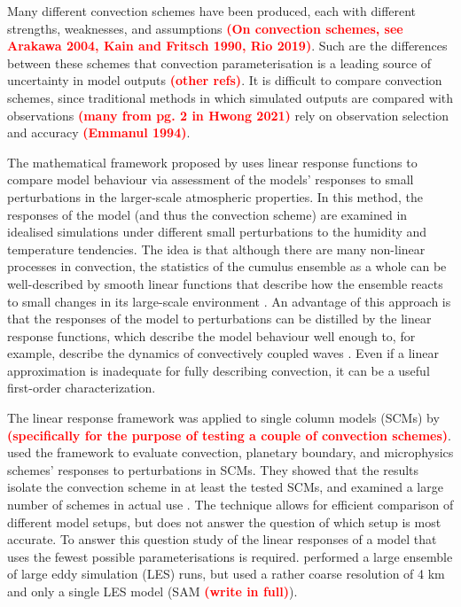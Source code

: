 \documentclass[draft]{agujournal2019}
\newcommand{\todo}[1]{\textcolor{red}{\textbf{(#1)}}}
\begin{document}
Many different convection schemes have been produced, each with different
strengths, weaknesses, and assumptions \todo{On convection schemes, see Arakawa
2004, Kain and Fritsch 1990, Rio 2019}. Such are the differences between these
schemes that convection parameterisation is a leading source of uncertainty in
model outputs \cite{Hwong_JAMES_2021} \todo{other refs}. It is difficult to
compare convection schemes, since traditional methods in which simulated outputs
are compared with observations \todo{many from pg. 2 in Hwong 2021} rely on
observation selection and accuracy \cite{Hwong_JAMES_2021} \todo{Emmanul 1994}.

The mathematical framework proposed by  uses linear
response functions to compare model behaviour via assessment of the models'
responses to small perturbations in the larger-scale atmospheric properties. In
this method, the responses of the model (and thus the convection scheme) are
examined in idealised simulations under different small perturbations to the
humidity and temperature tendencies. The idea is that although there are many
non-linear processes in convection, the statistics of the cumulus ensemble as a
whole can be well-described by smooth linear functions that describe how the
ensemble reacts to small changes in its large-scale environment
\cite{Kuang_JAS_2010}. An advantage of this approach is that the responses of
the model to perturbations can be distilled by the linear response functions,
which describe the model behaviour well enough to, for example, describe the
dynamics of convectively coupled waves \cite{Kuang_JAS_2010}. Even if a linear
approximation is inadequate for fully describing convection, it can be a useful
first-order characterization.

The linear response framework was applied to single column models (SCMs) by
 \todo{specifically for the purpose of testing a couple
of convection schemes}.  used the framework to evaluate
convection, planetary boundary, and microphysics schemes' responses to
perturbations in SCMs. They showed that the results isolate the convection
scheme in at least the tested SCMs, and examined a large number of schemes in
actual use \cite{Hwong_JAMES_2021}. The technique allows for efficient
comparison of different model setups, but does not answer the question of which
setup is most accurate. To answer this question study of the linear responses of
a model that uses the fewest possible parameterisations is required.
 performed a large ensemble of large eddy simulation (LES)
runs, but used a rather coarse resolution of 4 km and only a single LES model
(SAM \todo{write in full}).
\end{document}
